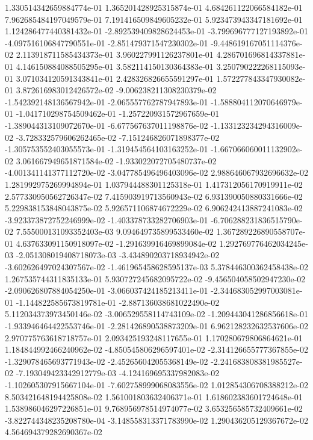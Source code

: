 1.330514342659884774e-01
1.365201428925315874e-01
4.684261122066584182e-01
7.962685484197049579e-01
7.191416509849605232e-01
5.923473943347181692e-01
1.124286477440381432e-01
-2.892539409828624453e-01
-3.799696777127193892e-01
-4.097516106847790551e-01
-2.851479371547230302e-01
-9.448619167051114376e-02
2.113918711585434373e-01
3.960227991126237801e-01
4.286701696814337881e-01
4.146150884088505295e-01
3.582114150130364383e-01
3.250790222268115093e-01
3.071034120591343841e-01
2.428326826655591297e-01
1.572277843347930082e-01
3.872616983012426572e-02
-9.006238211308230379e-02
-1.542392148136567942e-01
-2.065557762787947893e-01
-1.588804112070646979e-01
-1.041710298754509462e-01
-1.257220931572967659e-01
-1.389044313109072670e-01
-6.677567637011198876e-02
-1.133123234294316009e-02
-3.728332579606262465e-02
-7.151246826071898377e-02
-1.305753552403055573e-01
-1.319454564103163252e-01
-1.667066060011132902e-02
3.061667949651871584e-02
-1.933022072705480737e-02
-4.001341141377112720e-02
-3.047785496496403096e-02
2.988646067932696632e-02
1.281992975269994894e-01
1.037944488301125318e-01
1.417312056170919911e-02
2.577330950562726347e-02
7.415903919713560943e-02
6.931390050880331666e-02
5.229838153848043875e-02
5.926571106874672229e-02
6.906242413887241083e-02
-3.923373872752246999e-02
-1.403378733282706903e-01
-6.706288231836515790e-02
7.555000131093352403e-03
9.094649735899533460e-02
1.367289226890558707e-01
4.637633091150918097e-02
-1.291639916469899084e-02
1.292769776462034245e-03
-2.051308019408718073e-03
-3.434890203718934942e-02
-3.602626497024307567e-02
-1.461965458628595137e-03
5.378446300362458438e-02
1.267535744311835133e-01
5.930727245682095722e-02
-9.456504058502947230e-02
-2.090626807884054250e-01
-3.066037424185213411e-01
-2.344683052997003081e-01
-1.144822585673819781e-01
-2.887136038681022490e-02
5.112034373973450146e-02
-3.006529558114743109e-02
-1.209443041286856618e-01
-1.933946464422553746e-01
-2.281426890538873209e-01
6.962128232632537606e-02
2.970775763618718757e-01
2.093425193248117655e-01
1.170280679806864621e-01
1.184844992466240962e-02
-4.850545806296597401e-02
-2.314126655777367855e-02
-1.329078465693771943e-02
-2.452656042055368149e-02
-2.241683808381985527e-02
-7.193049423342912779e-03
-4.124169695337982083e-02
-1.102605307915667104e-01
-7.602758999068083556e-02
1.012854306708388212e-02
8.503421648194425808e-02
1.561001803632406371e-01
1.618602383601724648e-01
1.538986046297226851e-01
9.768956978514974077e-02
3.653256585732409661e-02
-3.822744348235208780e-04
-3.148558313371783990e-02
1.290436205129367672e-02
4.564694379282690367e-02
